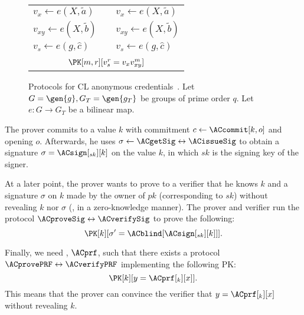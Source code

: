\begin{figure}
\begin{tabular}{lcl}
    \\

    \(v_x\gets e(X, \tilde a)\)
    &
    & \(v_x\gets e(X, \tilde a)\)

    \\

    \(v_{xy}\gets e(X, \tilde b)\)
    &
    & \(v_{xy}\gets e(X, \tilde b)\)

    \\

    \(v_s\gets e(g, \hat c)\)
    &
    & \(v_s\gets e(g, \hat c)\)

    \\\\

    \multicolumn{3}{c}{\(\PK[m,r][v_s^r = v_x v_{xy}^m]\)}

    \\\bottomrule
  \end{tabular}
  \caption{\label{ACacAlg}%
    Protocols for CL anonymous credentials~\cite{CLsignatures}.
    Let \(G = \gen{g}, G_T = \gen{g_T}\) be groups of prime order \(q\).
    Let \(e\colon G\to G_T\) be a bilinear map.
  }
\end{figure}

The prover commits to a value \(k\) with commitment \(c\gets \ACcommit[k, o]\) and opening \(o\).
Afterwards, he uses \(\sigma\gets \ACgetSig\leftrightarrow \ACissueSig\) to obtain a signature \(\sigma = \ACsign[_{sk}][k]\) on the value \(k\), in which \(sk\) is the signing key of the signer.

At a later point, the prover wants to prove to a verifier that he knows \(k\) and a signature \(\sigma\) on \(k\) made by the owner of \(pk\) (corresponding to \(sk\)) without revealing \(k\) nor \(\sigma\) (\ie, in a zero-knowledge manner).
The prover and verifier run the protocol \(\ACproveSig\leftrightarrow \ACverifySig\) to prove the following:
\begin{equation*}
  \PK[k][\sigma' = \ACblind[\ACsign[_{sk}][k]]].
\end{equation*}


Finally, we need , \(\ACprf\), such that there exists a protocol \(\ACprovePRF\leftrightarrow \ACverifyPRF\) implementing the following 
\ac{PK}:
\begin{equation*}
  \PK[k][y = \ACprf[_k][x]].
\end{equation*}
This means that the prover can convince the verifier that \(y = \ACprf[_k][x]\) without revealing \(k\).


